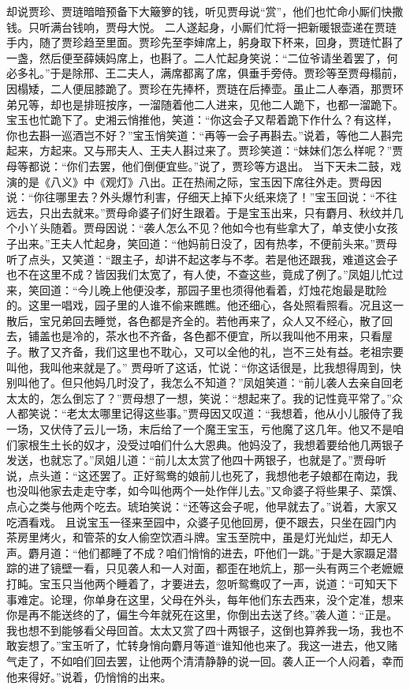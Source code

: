 \documentclass[12pt,oneside]{book}
\begin{document}
却说贾珍、贾琏暗暗预备下大簸箩的钱，听见贾母说“赏”，他们也忙命小厮们快撒钱。只听满台钱响，贾母大悦。
二人遂起身，小厮们忙将一把新暖银壶递在贾琏手内，随了贾珍趋至里面。贾珍先至李婶席上，躬身取下杯来，回身，贾琏忙斟了一盏，然后便至薛姨妈席上，也斟了。二人忙起身笑说：“二位爷请坐着罢了，何必多礼。”于是除邢、王二夫人，满席都离了席，俱垂手旁侍。贾珍等至贾母榻前，因榻矮，二人便屈膝跪了。贾珍在先捧杯，贾琏在后捧壶。虽止二人奉酒，那贾环弟兄等，却也是排班按序，一溜随着他二人进来，见他二人跪下，也都一溜跪下。宝玉也忙跪下了。史湘云悄推他，笑道：“你这会子又帮着跪下作什么？有这样，你也去斟一巡酒岂不好？”宝玉悄笑道：“再等一会子再斟去。”说着，等他二人斟完起来，方起来。又与邢夫人、王夫人斟过来了。贾珍笑道：“妹妹们怎么样呢？”贾母等都说：“你们去罢，他们倒便宜些。”说了，贾珍等方退出。
当下天未二鼓，戏演的是《八义》中《观灯》八出。正在热闹之际，宝玉因下席往外走。贾母因说：“你往哪里去？外头爆竹利害，仔细天上掉下火纸来烧了！”宝玉回说：“不往远去，只出去就来。”贾母命婆子们好生跟着。于是宝玉出来，只有麝月、秋纹并几个小丫头随着。贾母因说：“袭人怎么不见？他如今也有些拿大了，单支使小女孩子出来。”王夫人忙起身，笑回道：“他妈前日没了，因有热孝，不便前头来。”贾母听了点头，又笑道：“跟主子，却讲不起这孝与不孝。若是他还跟我，难道这会子也不在这里不成？皆因我们太宽了，有人使，不查这些，竟成了例了。”凤姐儿忙过来，笑回道：“今儿晚上他便没孝，那园子里也须得他看着，灯烛花炮最是耽险的。这里一唱戏，园子里的人谁不偷来瞧瞧。他还细心，各处照看照看。况且这一散后，宝兄弟回去睡觉，各色都是齐全的。若他再来了，众人又不经心，散了回去，铺盖也是冷的，茶水也不齐备，各色都不便宜，所以我叫他不用来，只看屋子。散了又齐备，我们这里也不耽心，又可以全他的礼，岂不三处有益。老祖宗要叫他，我叫他来就是了。”
贾母听了这话，忙说：“你这话很是，比我想得周到，快别叫他了。但只他妈几时没了，我怎么不知道？”凤姐笑道：“前儿袭人去亲自回老太太的，怎么倒忘了？”贾母想了一想，笑说：“想起来了。我的记性竟平常了。”众人都笑说：“老太太哪里记得这些事。”贾母因又叹道：“我想着，他从小儿服侍了我一场，又伏侍了云儿一场，末后给了一个魔王宝玉，亏他魔了这几年。他又不是咱们家根生土长的奴才，没受过咱们什么大恩典。他妈没了，我想着要给他几两银子发送，也就忘了。”凤姐儿道：“前儿太太赏了他四十两银子，也就是了。”贾母听说，点头道：“这还罢了。正好鸳鸯的娘前儿也死了，我想他老子娘都在南边，我也没叫他家去走走守孝，如今叫他两个一处作伴儿去。”又命婆子将些果子、菜馔、点心之类与他两个吃去。琥珀笑说：“还等这会子呢，他早就去了。”说着，大家又吃酒看戏。
且说宝玉一径来至园中，众婆子见他回房，便不跟去，只坐在园门内茶房里烤火，和管茶的女人偷空饮酒斗牌。宝玉至院中，虽是灯光灿烂，却无人声。麝月道：“他们都睡了不成？咱们悄悄的进去，吓他们一跳。”于是大家蹑足潜踪的进了镜壁一看，只见袭人和一人对面，都歪在地炕上，那一头有两三个老嬷嬷打盹。宝玉只当他两个睡着了，才要进去，忽听鸳鸯叹了一声，说道：“可知天下事难定。论理，你单身在这里，父母在外头，每年他们东去西来，没个定准，想来你是再不能送终的了，偏生今年就死在这里，你倒出去送了终。”袭人道：“正是。我也想不到能够看父母回首。太太又赏了四十两银子，这倒也算养我一场，我也不敢妄想了。”宝玉听了，忙转身悄向麝月等道“谁知他也来了。我这一进去，他又赌气走了，不如咱们回去罢，让他两个清清静静的说一回。袭人正一个人闷着，幸而他来得好。”说着，仍悄悄的出来。
\end{document}
